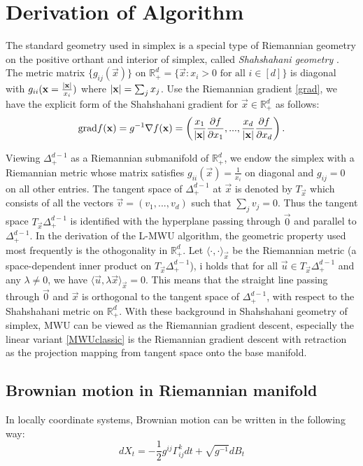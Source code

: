 \section{Derivation of Algorithm}
The standard geometry used in simplex is a special type of Riemannian geometry on the positive orthant and interior of simplex, called \emph{Shahshahani geometry} \cite{Shahshahani,HofSig}. The metric matrix $\{g_{ij}(\vec{x})\}$ on $\mathbb{R}_+^{d}=\{\vec{x}:x_i>0\text{ for all }i\in[d]\}$ is diagonal with $g_{ii}(\mathbf{x}=\frac{\left|\mathbf{x}\right|}{x_i})$ where $\left|\mathbf{x}\right|
=\sum_jx_j$. Use the Riemannian gradient \eqref{grad}, we have the explicit form of the Shahshahani gradient for $\vec{x}\in\mathbb{R}_+^d$ as follows:
\[
\mathrm{grad} f(\mathbf{x})=g^{-1}\nabla f(\mathbf{x})=\left(\frac{x_1}{\left|\mathbf{x}\right|}\frac{\partial f}{\partial x_1},...,\frac{x_d}{\left|\mathbf{x}\right|}\frac{\partial f}{\partial x_d}\right).
\]

Viewing $\Delta_+^{d-1}$ as a Riemannian submanifold of $\mathbb{R}_+^{d}$, we endow the simplex with a Riemannian metric whose matrix satisfies $g_{ii}(\vec{x})=\frac{1}{x_i}$ on diagonal and $g_{ij}=0$ on all other entries. The tangent space of $\Delta_+^{d-1}$ at $\vec{x}$ is denoted by $T_{\vec{x}}$ which consists of all the vectors $\vec{v}=(v_1,...,v_d)$ such that $\sum_jv_j=0$. Thus the tangent space $T_{\vec{x}}\Delta_+^{d-1}$ is identified with the hyperplane passing through $\vec{0}$ and parallel to $\Delta_+^{d-1}$. In the derivation of the L-MWU algorithm, the geometric property used most frequently is the othogonality in $\mathbb{R}_+^d$. Let $\langle\cdot,\cdot\rangle_{\vec{x}}$ be the Riemannian metric (a space-dependent inner product on $T_{\vec{x}}\Delta_+^{d-1}$), i holds that for all $\vec{u}\in T_{\vec{x}}\Delta_+^{d-1}$ and any $\lambda\ne 0$, we have $\langle\vec{u},\lambda\vec{x}\rangle_{\vec{x}}=0$. This means that the straight line passing through $\vec{0}$ and $\vec{x}$ is orthogonal to the tangent space of $\Delta_+^{d-1}$, with respect to the Shahshahani metric on $\mathbb{R}_+^d$. With these background in Shahshahani geometry of simplex, MWU can be viewed as the Riemannian gradient descent, especially the linear variant \eqref{MWUclassic} is the Riemannian gradient descent with retraction as the projection mapping from tangent space onto the base manifold.
\subsection{Brownian motion in Riemannian manifold}
In locally coordinate systems, Brownian motion can be written in the following way:
\[
dX_t=-\frac{1}{2}g^{ij}\Gamma^k_{ij}dt+\sqrt{g^{-1}}dB_t
\]




